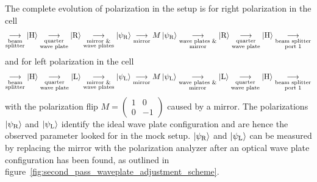 The complete evolution of polarization in the setup is for right polarization in the cell
\begin{align}
    \label{eq:second_pass_waveplate_adjustment_cascade_r}
    \underset{\substack{\text{beam}\\\text{splitter}}}{\longrightarrow}
    \Ket{\text{H}} 
    \underset{\substack{\text{quarter}\\\text{wave plate}}}{\longrightarrow}
    \Ket{\text{R}}
    \underset{\substack{\text{mirror \&}\\\text{wave plates}}}{\longrightarrow}
    \Ket{\psi_\text{R}}
    \underset{\substack{\text{mirror}}}{\longrightarrow}
    M\Ket{\psi_\text{R}}
    \underset{\substack{\text{wave plates \&}\\\text{mirror}}}{\longrightarrow}
    \Ket{\text{R}}
    \underset{\substack{\text{quarter}\\\text{wave plate}}}{\longrightarrow}
    \Ket{\text{H}}
    \underset{\substack{\text{beam splitter}\\\text{port 1}}}{\longrightarrow}
\end{align}
and for left polarization in the cell
\begin{align}
    \label{eq:second_pass_waveplate_adjustment_cascade_l}
    \underset{\substack{\text{beam}\\\text{splitter}}}{\longrightarrow}
    \Ket{\text{H}} 
    \underset{\substack{\text{quarter}\\\text{wave plate}}}{\longrightarrow}
    \Ket{\text{L}}
    \underset{\substack{\text{mirror \&}\\\text{wave plates}}}{\longrightarrow}
    \Ket{\psi_\text{L}}
    \underset{\substack{\text{mirror}}}{\longrightarrow}
    M\Ket{\psi_\text{L}}
    \underset{\substack{\text{wave plates \&}\\\text{mirror}}}{\longrightarrow}
    \Ket{\text{L}}
    \underset{\substack{\text{quarter}\\\text{wave plate}}}{\longrightarrow}
    \Ket{\text{H}}
    \underset{\substack{\text{beam splitter}\\\text{port 1}}}{\longrightarrow}
\end{align}
with the polarization flip $M = \left(\begin{smallmatrix}1&0\\0&-1\end{smallmatrix}\right)$ caused by a mirror. The polarizations $\Ket{\psi_\text{R}}$ and $\Ket{\psi_\text{L}}$ identify the ideal wave plate configuration and are hence the observed parameter looked for in the mock setup. $\Ket{\psi_\text{R}}$ and $\Ket{\psi_\text{L}}$ can be measured by replacing the mirror with the polarization analyzer after an optical wave plate configuration has been found, as outlined in figure~\ref{fig:second_pass_waveplate_adjustment_scheme}.

